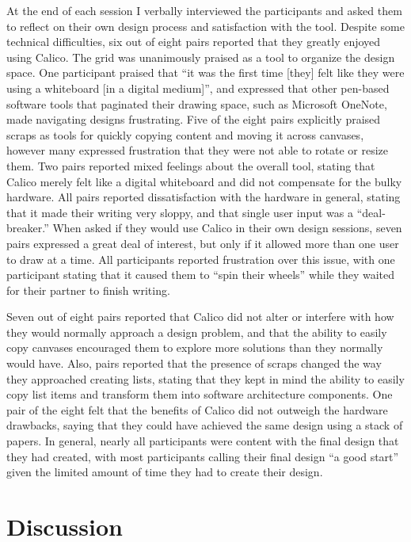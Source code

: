 At the end of each session I verbally interviewed the participants and asked them to reflect on their own design process and satisfaction with the tool. Despite some technical difficulties, six out of eight pairs reported that they greatly enjoyed using Calico. The grid was unanimously praised as a tool to organize the design space. One participant praised that ``it was the first time [they] felt like they were using a whiteboard [in a digital medium]'', and expressed that other pen-based software tools that paginated their drawing space, such as Microsoft OneNote, made navigating designs frustrating. Five of the eight pairs explicitly praised scraps as tools for quickly copying content and moving it across canvases, however many expressed frustration that they were not able to rotate or resize them. Two pairs reported mixed feelings about the overall tool, stating that Calico merely felt like a digital whiteboard and did not compensate for the bulky hardware. All pairs reported dissatisfaction with the hardware in general, stating that it made their writing very sloppy, and that single user input was a ``deal-breaker.'' When asked if they would use Calico in their own design sessions, seven pairs expressed a great deal of interest, but only if it allowed more than one user to draw at a time. All participants reported frustration over this issue, with one participant stating that it caused them to ``spin their wheels'' while they waited for their partner to finish writing. 

Seven out of eight pairs reported that Calico did not alter or interfere with how they would normally approach a design problem, and that the ability to easily copy canvases encouraged them to explore more solutions than they normally would have. Also, pairs reported that the presence of scraps changed the way they approached creating lists, stating that they kept in mind the ability to easily copy list items and transform them into software architecture components. One pair of the eight felt that the benefits of Calico did not outweigh the hardware drawbacks, saying that they could have achieved the same design using a stack of papers. In general, nearly all participants were content with the final design that they had created, with most participants calling their final design ``a good start'' given the limited amount of time they had to create their design. 

\section{Discussion}
\label{discussion}

